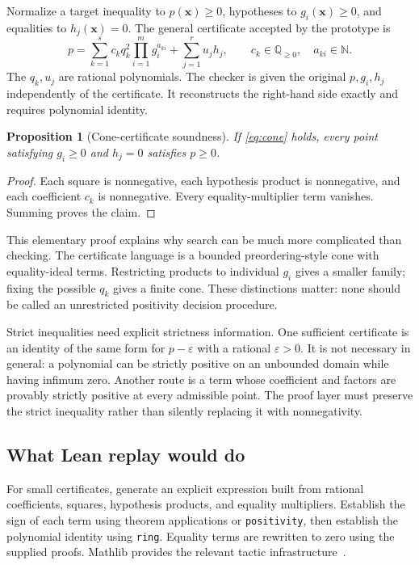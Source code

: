 \documentclass[11pt,a4paper]{article}
\newtheorem{proposition}{Proposition}[section]
\theoremstyle{definition}
\newcommand{\Q}{\mathbb{Q}}
\newcommand{\N}{\mathbb{N}}
\newcommand{\code}[1]{\texttt{#1}}
\begin{document}
Normalize a target inequality to $p(\bm x)\ge0$, hypotheses to $g_i(\bm x)\ge0$, and equalities to $h_j(\bm x)=0$. The general certificate accepted by the prototype is
\begin{equation}
 p=\sum_{k=1}^{s}c_k q_k^2\prod_{i=1}^{m}g_i^{a_{ki}}
        +\sum_{j=1}^{r}u_jh_j,
 \qquad c_k\in\Q_{\ge0},\quad a_{ki}\in\N.
 \label{eq:cone}
\end{equation}
The $q_k,u_j$ are rational polynomials. The checker is given the original $p,g_i,h_j$ independently of the certificate. It reconstructs the right-hand side exactly and requires polynomial identity.

\begin{proposition}[Cone-certificate soundness]
If \eqref{eq:cone} holds, every point satisfying $g_i\ge0$ and $h_j=0$ satisfies $p\ge0$.
\end{proposition}
\begin{proof}
Each square is nonnegative, each hypothesis product is nonnegative, and each coefficient $c_k$ is nonnegative. Every equality-multiplier term vanishes. Summing proves the claim.
\end{proof}

This elementary proof explains why search can be much more complicated than checking. The certificate language is a bounded preordering-style cone with equality-ideal terms. Restricting products to individual $g_i$ gives a smaller family; fixing the possible $q_k$ gives a finite cone. These distinctions matter: none should be called an unrestricted positivity decision procedure.

Strict inequalities need explicit strictness information. One sufficient certificate is an identity of the same form for $p-\varepsilon$ with a rational $\varepsilon>0$. It is not necessary in general: a polynomial can be strictly positive on an unbounded domain while having infimum zero. Another route is a term whose coefficient and factors are provably strictly positive at every admissible point. The proof layer must preserve the strict inequality rather than silently replacing it with nonnegativity.

\subsection{What Lean replay would do}

For small certificates, generate an explicit expression built from rational coefficients, squares, hypothesis products, and equality multipliers. Establish the sign of each term using theorem applications or \code{positivity}, then establish the polynomial identity using \code{ring}. Equality terms are rewritten to zero using the supplied proofs. Mathlib provides the relevant tactic infrastructure~\cite{positivity,ring}.
\end{document}

